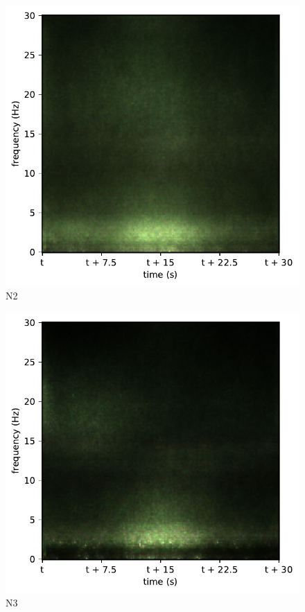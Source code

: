 \begin{subfigure}{.16\textwidth}
  \centering
  \includegraphics[width=1\linewidth]{./../Article/pics/class_rnn_2}
  \caption{N2}
  \label{fig_1_33}
\end{subfigure}%
\begin{subfigure}{.16\textwidth}
  \centering
  \includegraphics[width=1\linewidth]{./../Article/pics/class_rnn_3}
  \caption{N3}
  \label{fig_1_34}
\end{subfigure}%
